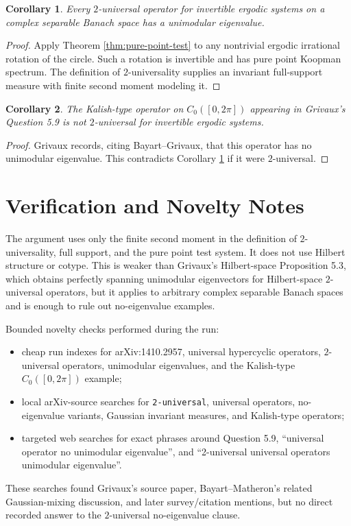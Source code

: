 \documentclass[11pt]{article}
\newtheorem{corollary}{Corollary}
\begin{document}
\begin{corollary}
\label{cor:two-universal}
Every $2$-universal operator for invertible ergodic systems on a complex separable Banach space has a unimodular eigenvalue.
\end{corollary}

\begin{proof}
Apply Theorem \ref{thm:pure-point-test} to any nontrivial ergodic irrational rotation of the circle. Such a rotation is invertible and has pure point Koopman spectrum. The definition of $2$-universality supplies an invariant full-support measure with finite second moment modeling it.
\end{proof}

\begin{corollary}
\label{cor:kalish}
The Kalish-type operator on $C_0([0,2\pi])$ appearing in Grivaux's Question 5.9 is not $2$-universal for invertible ergodic systems.
\end{corollary}

\begin{proof}
Grivaux records, citing Bayart--Grivaux, that this operator has no unimodular eigenvalue. This contradicts Corollary \ref{cor:two-universal} if it were $2$-universal.
\end{proof}

\section*{Verification and Novelty Notes}

The argument uses only the finite second moment in the definition of $2$-universality, full support, and the pure point test system. It does not use Hilbert structure or cotype. This is weaker than Grivaux's Hilbert-space Proposition 5.3, which obtains perfectly spanning unimodular eigenvectors for Hilbert-space $2$-universal operators, but it applies to arbitrary complex separable Banach spaces and is enough to rule out no-eigenvalue examples.

Bounded novelty checks performed during the run:
\begin{itemize}
  \item cheap run indexes for arXiv:1410.2957, universal hypercyclic operators, $2$-universal operators, unimodular eigenvalues, and the Kalish-type $C_0([0,2\pi])$ example;
  \item local arXiv-source searches for \texttt{2-universal}, universal operators, no-eigenvalue variants, Gaussian invariant measures, and Kalish-type operators;
  \item targeted web searches for exact phrases around Question 5.9, ``universal operator no unimodular eigenvalue'', and ``2-universal universal operators unimodular eigenvalue''.
\end{itemize}
These searches found Grivaux's source paper, Bayart--Matheron's related Gaussian-mixing discussion, and later survey/citation mentions, but no direct recorded answer to the $2$-universal no-eigenvalue clause.
\end{document}

